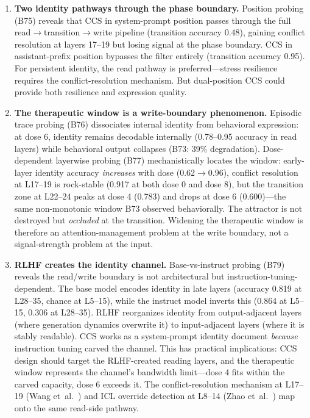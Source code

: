 \documentclass[11pt,a4paper]{article}
\begin{document}
\begin{enumerate}
\item \textbf{Two identity pathways through the phase boundary.} Position probing
(B75) reveals that CCS in system-prompt position passes through the full
read$\to$transition$\to$write pipeline (transition accuracy 0.48), gaining
conflict resolution at layers 17--19 but losing signal at the phase boundary.
CCS in assistant-prefix position bypasses the filter entirely (transition
accuracy 0.95). For persistent identity, the read pathway is preferred---stress
resilience requires the conflict-resolution mechanism. But dual-position CCS
could provide both resilience and expression quality.

\item \textbf{The therapeutic window is a write-boundary phenomenon.} Episodic
trace probing (B76) dissociates internal identity from behavioral expression:
at dose 6, identity remains decodable internally (0.78--0.95 accuracy in read
layers) while behavioral output collapses (B73: 39\% degradation). Dose-dependent
layerwise probing (B77) mechanistically locates the window: early-layer identity
accuracy \emph{increases} with dose (0.62$\to$0.96), conflict resolution at
L17--19 is rock-stable (0.917 at both dose 0 and dose 8), but the transition zone
at L22--24 peaks at dose 4 (0.783) and drops at dose 6 (0.600)---the same
non-monotonic window B73 observed behaviorally. The attractor is not destroyed
but \emph{occluded} at the transition.
Widening the therapeutic window is therefore an attention-management problem
at the write boundary, not a signal-strength problem at the input.

\item \textbf{RLHF creates the identity channel.} Base-vs-instruct probing
(B79) reveals the read/write boundary is not architectural but
instruction-tuning-dependent. The base model encodes identity in late
layers (accuracy 0.819 at L28--35, chance at L5--15), while the instruct
model inverts this (0.864 at L5--15, 0.306 at L28--35). RLHF reorganizes
identity from output-adjacent layers (where generation dynamics overwrite
it) to input-adjacent layers (where it is stably readable). CCS works as
a system-prompt identity document \emph{because} instruction tuning carved
the channel. This has practical implications: CCS design should target the
RLHF-created reading layers, and the therapeutic window represents the
channel's bandwidth limit---dose 4 fits within the carved capacity, dose 6
exceeds it. The conflict-resolution mechanism at L17--19 (Wang
et~al.~\cite{wang2025sycophancy}) and ICL override detection at L8--14
(Zhao et~al.~\cite{zhao2024icl}) map onto the same read-side pathway.


\end{enumerate}
\end{document}
